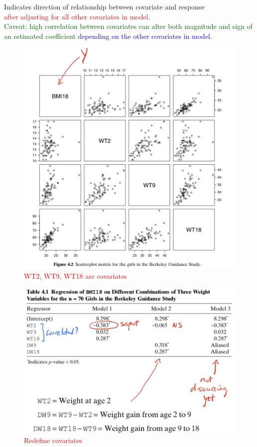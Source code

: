 \documentclass[14pt]{extarticle}
\begin{document}
\noindent
Indicates direction of relationship between covariate and response \\
\textcolor{red}{after adjusting for all other covariates in model.} \\
\textcolor{darkgreen}{Caveat: high correlation between covariates can alter both magnitude and sign of an estimated coefficient }\textcolor{blue}{depending on the other covariates in model.}
\begin{figure}[H]
    \centering
    \includegraphics[width=1\textwidth]{fig2.png}
    \textcolor{red}{WT2, WT9, WT18 are covariates}
\end{figure}

\begin{figure}[H]
    \centering
    \includegraphics[width=1\textwidth]{fig3.png}
    \textcolor{red}{Redefine covariates}
\end{figure}
\end{document}
